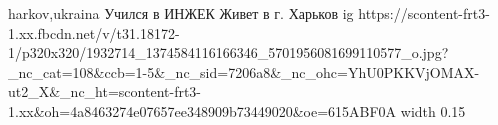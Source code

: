  
 
 
 
 

\par
harkov,ukraina
Учился в ИНЖЕК
Живет в г. Харьков
\ifcmt
  ig https://scontent-frt3-1.xx.fbcdn.net/v/t31.18172-1/p320x320/1932714_1374584116166346_5701956081699110577_o.jpg?_nc_cat=108&ccb=1-5&_nc_sid=7206a8&_nc_ohc=YhU0PKKVjOMAX-ut2_X&_nc_ht=scontent-frt3-1.xx&oh=4a8463274e07657ee348909b73449020&oe=615ABF0A
  width 0.15
\fi

